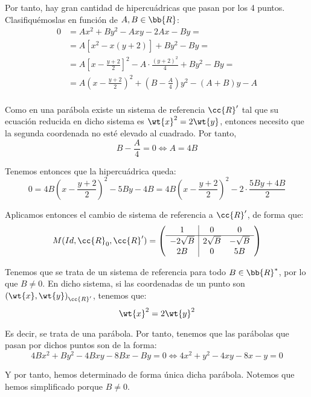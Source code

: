 \begin{ejercicio}
    Por tanto, hay gran cantidad de hipercuádricas que pasan por los 4 puntos. Clasifiquémoslas en función de $A,B\in \bb{R}$:
    \begin{equation*}
        \begin{split}
            0 &= Ax^2+By^2-Axy-2Ax-By =\\
            &= A[x^2-x(y+2)]+By^2-By =\\
            &= A\left[x-\frac{y+2}{2}\right]^2 - A\cdot \frac{(y+2)^2}{4} +By^2-By =\\
            &= A\left(x-\frac{y+2}{2}\right)^2 + \left(B-\frac{A}{4}\right)y^2 -(A+B)y -A\\
        \end{split}
    \end{equation*}

    Como en una parábola existe un sistema de referencia $\cc{R}'$ tal que su ecuación reducida en dicho sistema es $\wt{x}^2=2\wt{y}$, entonces necesito que la segunda coordenada no esté elevado al cuadrado. Por tanto,
    \begin{equation*}
        B-\frac{A}{4} = 0 \Longleftrightarrow A=4B
    \end{equation*}

    Tenemos entonces que la hipercuádrica queda:
    \begin{equation*}
        0 = 4B\left(x-\frac{y+2}{2}\right)^2 -5By -4B
        = 4B\left(x-\frac{y+2}{2}\right)^2 -2\cdot \frac{5By+4B}{2}
    \end{equation*}

    Aplicamos entonces el cambio de sistema de referencia a $\cc{R}'$, de forma que:
    \begin{equation*}
        M(Id, \cc{R}_0, \cc{R}') = \left(\begin{array}{c|cc}
            1 & 0 & 0 \\ \hline
            -2\sqrt{B} & 2\sqrt{B} & -\sqrt{B}\\ 
            2B & 0 & 5B
        \end{array}\right)
    \end{equation*}

    Tenemos que se trata de un sistema de referencia para todo $B\in \bb{R}^\ast$, por lo que $B\neq 0$. En dicho sistema, si las coordenadas de un punto son ${(\wt{x}, \wt{y})}_{\cc{R}'}$, tenemos que:
    \begin{equation*}
        \wt{x}^2 = 2\wt{y}^2
    \end{equation*}

    Es decir, se trata de una parábola. Por tanto, tenemos que las parábolas que pasan por dichos puntos son de la forma:
    \begin{equation*}
        4Bx^2 + By^2-4Bxy -8Bx-By=0 \Longleftrightarrow 4x^2 + y^2-4xy -8x-y=0
    \end{equation*}

    Y por tanto, hemos determinado de forma única dicha parábola. Notemos que hemos simplificado porque $B\neq 0$.
\end{ejercicio}


